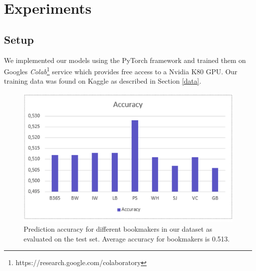 \documentclass[a4paper]{article}
\begin{document}
\section{Experiments} \label{experiments}
\subsection{Setup}
We implemented our models using the PyTorch framework \cite{PyTorch} and trained them on Googles \textit{Colab}\footnote{https://research.google.com/colaboratory} service which provides free access to a Nvidia K80 GPU. Our training data was found on Kaggle as described in Section \ref{data}. 


\begin{figure} 
\includegraphics[scale=0.40]{img/bmacc.png}
\caption{Prediction accuracy for different bookmakers in our dataset as evaluated on the test set. Average accuracy for bookmakers is 0.513.}
\label{fig:bmacc}
\end{figure}
\end{document}
